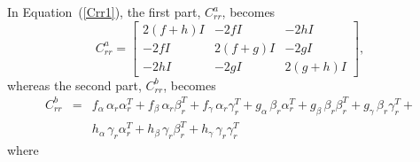 \documentclass[11pt]{article}
\begin{document}
In Equation~(\ref{Crr1}), the first part, $C_{rr}^a$, becomes 
\begin{equation}
C_{rr}^a = \left[ 
\begin{array}{ccc}
2(f+h) I & -2f I  &-2h  I \\
-2f I  & 2(f+g) I & -2g  I \\
-2h I  & -2g I  & 2(g+h) I 
\end{array}
\right],
\end{equation}
whereas the second part, $C_{rr}^b$, becomes
\begin{eqnarray}
C_{rr}^b &=& 
f_\alpha \,\alpha_{r} \alpha_{r}^T + 
f_\beta \,\alpha_{r} \beta_{r}^T + 
f_\gamma \,\alpha_{r} \gamma_{r}^T + 
g_\alpha \,\beta_{r} \alpha_{r}^T + 
g_\beta \,\beta_{r} \beta_{r}^T + 
g_\gamma \,\beta_{r} \gamma_{r}^T + \nonumber \\
& &h_\alpha \,\gamma_{r} \alpha_{r}^T + 
h_\beta \,\gamma_{r} \beta_{r}^T + 
h_\gamma \, \gamma_{r} \gamma_{r}^T 
\end{eqnarray}
where
\end{document}
